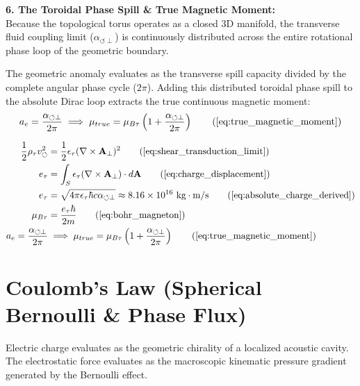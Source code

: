 \documentclass[11pt, a4paper]{article}
\begin{document}
\textbf{6. The Toroidal Phase Spill \& True Magnetic Moment:} \\
Because the topological torus operates as a closed 3D manifold, the transverse fluid coupling limit ($\alpha_{\circlearrowleft \perp}$) is continuously distributed across the entire rotational phase loop of the geometric boundary. 

The geometric anomaly evaluates as the transverse spill capacity divided by the complete angular phase cycle ($2\pi$). Adding this distributed toroidal phase spill to the absolute Dirac loop extracts the true continuous magnetic moment:
\begin{equation}
    a_e = \frac{\alpha_{\circlearrowleft \perp}}{2\pi} \implies \mu_{true} = \mu_{B\tau} \left( 1 + \frac{\alpha_{\circlearrowleft \perp}}{2\pi} \right) \tag{\ref{eq:true_magnetic_moment}}
\end{equation}

\begin{tcolorbox}[recallbox, title={\ref{box:kinematic_charge}. The Kinematic Origin of Charge \& $g-2$}]
\begin{align}
    \frac{1}{2}\rho_{\tau} v_{\circlearrowleft}^2 &= \frac{1}{2}\epsilon_{\tau} (\nabla \times \mathbf{A}_{\perp})^2 \tag{\ref{eq:shear_transduction_limit}} \\
    e_{\tau} &= \int_S \epsilon_{\tau} (\nabla \times \mathbf{A}_{\perp}) \cdot d\mathbf{A} \tag{\ref{eq:charge_displacement}} \\
    e_{\tau} &= \sqrt{4\pi \epsilon_{\tau} \hbar c \alpha_{\circlearrowleft \perp}} \approx 8.16 \times 10^{16} \text{ kg}\cdot\text{m/s} \tag{\ref{eq:absolute_charge_derived}} \\
    \mu_{B\tau} &= \frac{e_{\tau} \hbar}{2m} \tag{\ref{eq:bohr_magneton}} \\
    a_e = \frac{\alpha_{\circlearrowleft \perp}}{2\pi} &\implies \mu_{true} = \mu_{B\tau} \left( 1 + \frac{\alpha_{\circlearrowleft \perp}}{2\pi} \right) \tag{\ref{eq:true_magnetic_moment}}
\end{align}
\end{tcolorbox}

\section{Coulomb's Law (Spherical Bernoulli \& Phase Flux)}
\label{sec:deriv_coulomb_bernoulli}

Electric charge evaluates as the geometric chirality of a localized acoustic cavity. The electrostatic force evaluates as the macroscopic kinematic pressure gradient generated by the Bernoulli effect.
\end{document}
